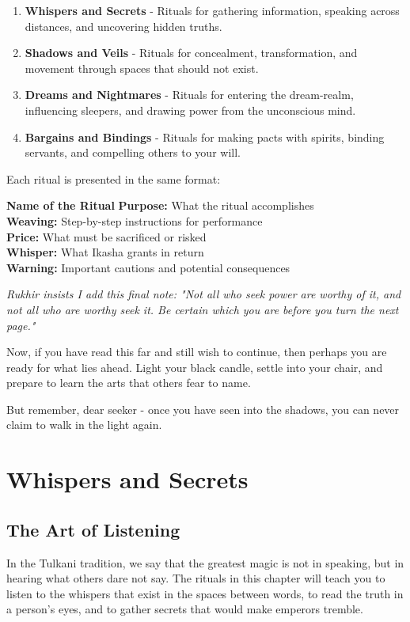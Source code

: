 \documentclass[12pt,twoside]{book}
\newcommand{\ritualname}[1]{\vspace{10pt}\noindent\textbf{\large #1}\vspace{5pt}}
\newcommand{\shadow}[1]{\textit{#1}}
\begin{document}
\begin{enumerate}
\item \textbf{Whispers and Secrets} - Rituals for gathering information, speaking across distances, and uncovering hidden truths.
\item \textbf{Shadows and Veils} - Rituals for concealment, transformation, and movement through spaces that should not exist.
\item \textbf{Dreams and Nightmares} - Rituals for entering the dream-realm, influencing sleepers, and drawing power from the unconscious mind.
\item \textbf{Bargains and Bindings} - Rituals for making pacts with spirits, binding servants, and compelling others to your will.
\end{enumerate}

Each ritual is presented in the same format:

\ritualname{Name of the Ritual}
\textbf{Purpose:} What the ritual accomplishes\\
\textbf{Weaving:} Step-by-step instructions for performance\\
\textbf{Price:} What must be sacrificed or risked\\
\textbf{Whisper:} What Ikasha grants in return\\
\textbf{Warning:} Important cautions and potential consequences

\shadow{Rukhir insists I add this final note: "Not all who seek power are worthy of it, and not all who are worthy seek it. Be certain which you are before you turn the next page."}

Now, if you have read this far and still wish to continue, then perhaps you are ready for what lies ahead. Light your black candle, settle into your chair, and prepare to learn the arts that others fear to name.

But remember, dear seeker - once you have seen into the shadows, you can never claim to walk in the light again.

\chapter{Whispers and Secrets}

\section*{The Art of Listening}

In the Tulkani tradition, we say that the greatest magic is not in speaking, but in hearing what others dare not say. The rituals in this chapter will teach you to listen to the whispers that exist in the spaces between words, to read the truth in a person's eyes, and to gather secrets that would make emperors tremble.
\end{document}
